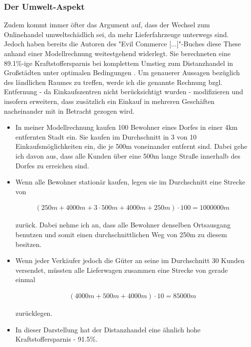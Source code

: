 \documentclass[a4paper, 12pt]{scrartcl}
\makeatletter
\newenvironment{folding}{\endgroup}{\begingroup \def \@currenvir{folding}\edef \@currenvline{\on@line}}
\makeatother
\begin{document}
\begin{folding} \subsubsection{Der Umwelt-Aspekt} %

Zudem kommt immer öfter das Argument auf, dass der Wechsel zum Onlinehandel umweltschädlich sei, da mehr Lieferfahrzeuge unterwegs sind. Jedoch haben bereits die Autoren des "Evil Commerce [...]"-Buches diese These anhand einer Modellrechnung weitestgehend widerlegt. Sie berechneten eine 89.1\%-ige Kraftstoffersparnis bei komplettem Umstieg zum Distanzhandel in Großstädten unter optimalen Bedingungen \cite[S. 25f]{evilcom}. Um genauerer Aussagen bezüglich des ländlichen Raumes zu treffen, werde ich die genannte Rechnung bzgl. Entfernung - da Einkaufszentren nicht berücksichtigt wurden - modifizieren und insofern erweitern, dass zusätzlich ein Einkauf in mehreren Geschäften nacheinander mit in Betracht gezogen wird.

\begin{itemize}

\item In meiner Modellrechnung kaufen 100 Bewohner eines Dorfes in einer 4km entfernten Stadt ein. Sie kaufen im Durchschnitt in 3 von 10 Einkaufsmöglichkeiten ein, die je 500m voneinander entfernt sind. Dabei gehe ich davon aus, dass alle Kunden über eine 500m lange Straße innerhalb des Dorfes zu erreichen sind.

\item Wenn alle Bewohner stationär kaufen, legen sie im Durchschnitt eine Strecke von 

\begin{align}(250m + 4000m + 3 \cdot 500m + 4000m + 250m) \cdot 100 = 1000000m\end{align}

 zurück. Dabei nehme ich an, dass alle Bewohner denselben Ortsausgang benutzen und somit einen durchschnittlichen Weg von 250m zu diesem besitzen.

\item Wenn jeder Verkäufer jedoch die Güter an seine im Durchschnitt 30 Kunden versendet, müssten alle Lieferwagen zusammen eine Strecke von gerade einmal 

\begin{align}(4000m + 500m + 4000m) \cdot 10 = 85000m\end{align}

zurücklegen.
\item In dieser Darstellung hat der Distanzhandel eine ähnlich hohe Kraftstoffersparnis - 91.5\%. 


\end{itemize}
\end{folding}
\end{document}
